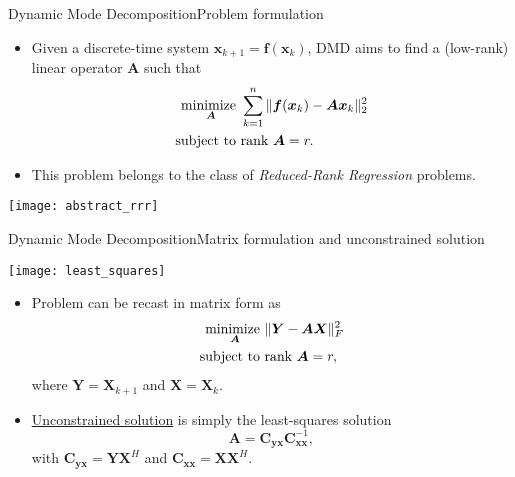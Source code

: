 \begin{frame}[t, c]{Dynamic Mode Decomposition}{Problem formulation}
  \begin{minipage}{.68\textwidth}
    \begin{itemize}
    \item Given a discrete-time system \( \bm{x}_{k+1} = \bm{f}(\bm{x}_k) \), DMD aims to find a (low-rank) linear operator \( \bm{A} \) such that
      \[
        \begin{aligned}
          \operatorname*{minimize~}_{\bm{A}} & \sum_{k=1}^n \| \bm{f}(\bm{x}_k) - \bm{Ax}_k \|_2^2 \\
          \operatorname*{subject~to~} & \text{rank } \bm{A} = r.
        \end{aligned}
      \]
      
      \medskip
      
    \item This problem belongs to the class of \emph{Reduced-Rank Regression} problems.
    \end{itemize}
  \end{minipage}%
  \hfill
  \begin{minipage}{.28\textwidth}
    \centering
    \texttt{[image: abstract\_rrr]}
  \end{minipage}
  
  \vspace{1cm}
\end{frame}

\begin{frame}[t, c]{Dynamic Mode Decomposition}{Matrix formulation and unconstrained solution}
  \begin{minipage}{.28\textwidth}
    \centering
    \texttt{[image: least\_squares]}
  \end{minipage}%
  \hfill
  \begin{minipage}{.68\textwidth}
    \begin{itemize}
    \item Problem can be recast in matrix form as
      \[
        \begin{aligned}
          \operatorname*{minimize~}_{\bm{A}} & \| \bm{Y} - \bm{AX} \|_F^2 \\
          \operatorname*{subject~to~} & \text{rank } \bm{A} = r,
        \end{aligned}
      \]
      where \( \bm{Y} = \bm{X}_{k+1} \) and \( \bm{X} = \bm{X}_k \).
      
      \medskip
      
    \item \underline{Unconstrained solution} is simply the least-squares solution
      \[
        \bm{A} = \bm{C}_{\bm{yx}} \bm{C}_{\bm{xx}}^{-1},
      \]
      with \( \bm{C}_{\bm{yx}} = \bm{YX}^H \) and \( \bm{C}_{\bm{xx}} = \bm{XX}^H \).
    \end{itemize}
  \end{minipage}
  
  \vspace{1cm}
\end{frame}

